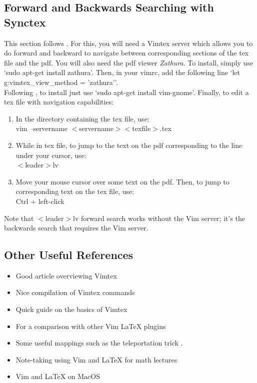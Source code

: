 \documentclass[10pt]{article}
\newcommand{\tlangle}{$<$}
\newcommand{\trangle}{$>$}
\begin{document}
\subsection{Forward and Backwards Searching with Synctex}
This section follows \cite{gunther2014vimtex}. For this, you will need a Vimtex
server which allows you to do forward and backward to navigate between
corresponding sections of the tex file and the pdf. You will also need the pdf
viewer \textit{Zathura}. To install, simply use `sudo apt-get install zathura'.
Then, in your vimrc, add the following line `let g:vimtex\_view\_method =
'zathura''.\\

Following \cite{lerner2004enable}, to install just use `sudo apt-get install
vim-gnome'. Finally, to edit a tex file with navigation capabilities:
\begin{enumerate}
    \item In the directory containing the tex file, use:\\
        vim --servername \tlangle servername\trangle \tlangle texfile\trangle.tex
    \item While in tex file, to jump to the text on the pdf corresponding to the
        line under your cursor, use:\\
        \tlangle leader\trangle lv
    \item Move your mouse cursor over some text on the pdf. Then, to jump to
        corresponding text on the tex file, use:\\
        Ctrl + left-click
\end{enumerate}
Note that \tlangle leader\trangle lv forward search works without the Vim
server; it's the backwards search that requires the Vim server.

\subsection{Other Useful References}
\begin{itemize}
    \item Good article overviewing Vimtex \cite{woodruff2019latex}
    \item Nice compilation of Vimtex commands \cite{gunther2014vimtex}
    \item Quick guide on the basics of Vimtex \cite{jdhao2019complete}
    \item For a comparison with other Vim LaTeX plugins \cite{lervag2015vim}
    \item Some useful mappings such as the teleportation trick
        \cite{smith2016my, smith2017start}.
    \item Note-taking using Vim and LaTeX for math lectures \cite{castel2019how}
    \item Vim and LaTeX on MacOS \cite{dyke2020getting}
\end{itemize}
\end{document}
